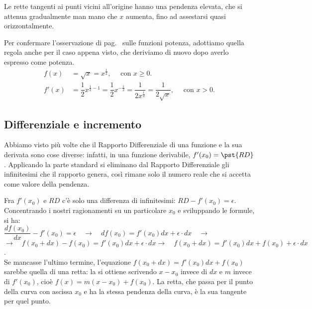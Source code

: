 
Le rette tangenti ai punti vicini all'origine hanno una pendenza elevata, 
che si attenua gradualmente man mano che \(x\) aumenta, fino ad 
assestarsi quasi orizzontalmente.

\begin{osservazione}
 Per confermare l'osservazione di pag.~\pageref{oss:regola3}  sulle 
funzioni potenza, adottiamo quella regola anche per il caso appena visto, 
che deriviamo di nuovo dopo averlo espresso come potenza.
\begin{align*}
 f(x)&=\sqrt{x}=x^{\frac{1}{2}},\quad \text{ con  } x\geq 0.\\
 f'(x)&=\dfrac{1}{2}x^{\frac{1}{2}-1}=\dfrac{1}{2}x^{-\frac{1}{2}}=
 \dfrac{1}{2x^{\frac{1}{2}}}=\dfrac{1}{2\sqrt{x}},\quad \text{ con  } x > 0.
\end{align*}
\end{osservazione}

\subsection{Differenziale e incremento}
\label{subsec:diff01_diff_inc}
Abbiamo visto più volte che il Rapporto Differenziale di una funzione e la 
sua derivata sono cose diverse: infatti, in una funzione derivabile,
\(f'(x_0)=\pst{RD}\). Applicando la parte standard si eliminano dal Rapporto 
Differenziale gli infinitesimi che il rapporto genera, così rimane solo il 
numero reale che si accetta come valore della pendenza.

Fra \(f'(x_0)\) e \(RD\) c'è solo una differenza di infinitesimi:
\(RD-f'(x_0)=\epsilon\). Concentrando i nostri ragionamenti su un 
particolare \(x_0\) e sviluppando le formule, si ha:\\
\(\dfrac{df(x_0)}{dx}-f'(x_0)=\epsilon\quad \rightarrow\quad
df(x_0)=f'(x_0)dx+\epsilon\cdot dx\quad \rightarrow\)\\
\(\rightarrow\quad f(x_0+dx)-f(x_0)=f'(x_0)dx+\epsilon\cdot dx
\rightarrow\quad f(x_0+dx)=f'(x_0)dx+f(x_0)+\epsilon\cdot dx\).\\
Se mancasse l'ultimo termine, l'equazione \(f(x_0+dx)=f'(x_0)dx+f(x_0)\) 
sarebbe quella di una retta: la si ottiene scrivendo \(x-x_0\) invece di 
\(dx\) e \(m\) invece di \(f'(x_0)\), cioè \(f(x)=m(x-x_0) +f(x_0)\). 
La retta, che passa per il punto della curva con ascissa \(x_0\) e ha la 
stessa pendenza della curva, è la sua tangente per quel punto. 

